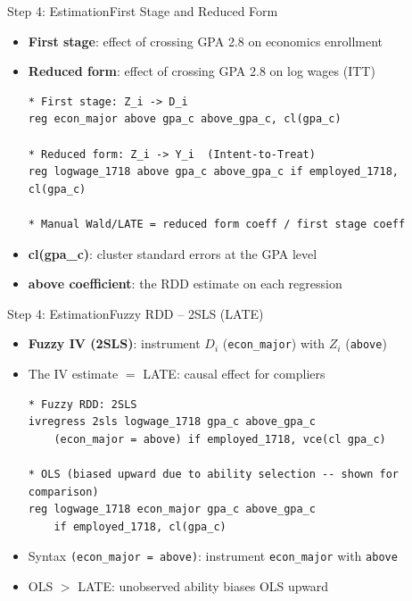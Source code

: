 \documentclass[hyperref={pdfpagelabels=false}]{beamer}
\begin{document}

\begin{frame}[fragile]{Step 4: Estimation}{First Stage and Reduced Form}
	\begin{itemize}
		\item \textbf{First stage}: effect of crossing GPA 2.8 on economics enrollment
		\item \textbf{Reduced form}: effect of crossing GPA 2.8 on log wages (ITT)
\begin{lstlisting}
* First stage: Z_i -> D_i
reg econ_major above gpa_c above_gpa_c, cl(gpa_c)

* Reduced form: Z_i -> Y_i  (Intent-to-Treat)
reg logwage_1718 above gpa_c above_gpa_c if employed_1718, cl(gpa_c)

* Manual Wald/LATE = reduced form coeff / first stage coeff
\end{lstlisting}
		\vspace{0.2cm}
		\item \textbf{cl(gpa\_c)}: cluster standard errors at the GPA level
		\vspace{0.2cm}
		\item \textbf{above coefficient}: the RDD estimate on each regression
	\end{itemize}
\end{frame}


\begin{frame}[fragile]{Step 4: Estimation}{Fuzzy RDD -- 2SLS (LATE)}
	\begin{itemize}
		\item \textbf{Fuzzy IV (2SLS)}: instrument $D_i$ (\texttt{econ\_major}) with $Z_i$ (\texttt{above})
		\item The IV estimate $= $ LATE: causal effect for compliers
\begin{lstlisting}
* Fuzzy RDD: 2SLS
ivregress 2sls logwage_1718 gpa_c above_gpa_c
    (econ_major = above) if employed_1718, vce(cl gpa_c)

* OLS (biased upward due to ability selection -- shown for comparison)
reg logwage_1718 econ_major gpa_c above_gpa_c
    if employed_1718, cl(gpa_c)
\end{lstlisting}
		\vspace{0.2cm}
		\item Syntax \texttt{(econ\_major = above)}: instrument \texttt{econ\_major} with \texttt{above}
		\vspace{0.2cm}
		\item OLS $> $ LATE: unobserved ability biases OLS upward
	\end{itemize}
\end{frame}
\end{document}
